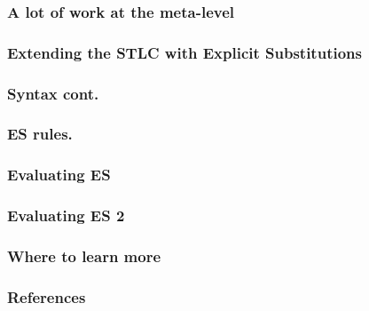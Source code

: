 \documentclass
  [hyperref={colorlinks = true,linkcolor = blue, 
             citecolor = blue, urlcolor = blue}
  ]{beamer}
\newcommand{\SlidePath}[1]{./Slides/#1}
\begin{document}
\begin{frame}[fragile]
  \frametitle{A lot of work at the meta-level}
\end{frame}


\begin{frame}[fragile]
  \frametitle{Explicit Substitutions: (1991) Explicit Substitutions}
  }
\end{frame}

\begin{frame}[fragile]
  \frametitle{Extending the STLC with Explicit Substitutions}
\end{frame}

\begin{frame}[fragile]
  \frametitle{Syntax cont.}
\end{frame}

\begin{frame}[fragile]
  \frametitle{ES rules.}
\end{frame}

\begin{frame}[fragile]
  \frametitle{Evaluating ES}
\end{frame}

\begin{frame}[fragile]
  \frametitle{Evaluating ES 2}
\end{frame}

\begin{frame}[fragile]
  \frametitle{Where to learn more}
\end{frame}





%   


\begin{frame}[fragile]
\frametitle{References}
{}
\end{frame}
\end{document}
